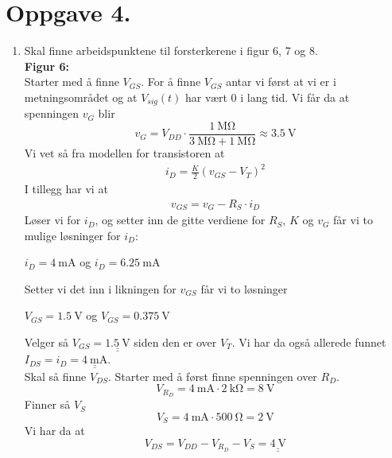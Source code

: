 \documentclass[a4paper,11pt,norsk]{article}
\begin{document}
\section*{Oppgave 4.}
\begin{enumerate}
    \item Skal finne arbeidspunktene til forsterkerene i figur 6, 7 og 8. \\
        
        \textbf{Figur 6:} \\
        Starter med å finne $V_{GS}$. For å finne $V_{GS}$ antar vi først at vi er i metningsområdet og at $V_{sig}(t)$ har vært 0 i lang tid.
        Vi får da at spenningen $v_{G}$ blir 
        \[
            v_{G} = V_{DD} \cdot \frac{\SI{1}{\mega\ohm}}{\SI{3}{\mega\ohm} + \SI{1}{\mega\ohm}} \approx \SI{3.5}{\volt}
        \]
        Vi vet så fra modellen for transistoren at 
        \begin{align}
            i_{D} = \frac{K}{2}\left(v_{GS} - V_T\right)^2
        \end{align}
        I tillegg har vi at 
        \begin{align}
            v_{GS} = v_{G} - R_S \cdot i_D
        \end{align}
        \newpage
        Løser vi for $i_{D}$, og setter inn de gitte verdiene for $R_S$, $K$ og $v_{G}$ 
        får vi to mulige løsninger for $i_{D}$:
        \begin{center}
            $i_D = \SI{4}{\milli\ampere}$ og $i_D = \SI{6.25}{\milli\ampere}$ 
        \end{center}
        Setter vi det inn i likningen for $v_{GS}$ får vi to løsninger
        \begin{center}
            $V_{GS} = \SI{1.5}{\volt}$ og $V_{GS} = \SI{0.375}{\volt}$ 
        \end{center}
        Velger så $V_{GS} = \underline{\underline{\SI{1.5}{\volt}}}$ siden den er over $V_T$.
        Vi har da også allerede funnet $I_{DS} = i_D = \underline{\underline{\SI{4}{\milli\ampere}}}$. \\

        Skal så finne $V_{DS}$. Starter med å først finne spenningen over $R_D$.
        \[
            V_{R_D} = \SI{4}{\milli\ampere} \cdot \SI{2}{\kilo\ohm} = \SI{8}{\volt}
        \]
        Finner så $V_S$
        \[
            V_S = \SI{4}{\milli\ampere} \cdot \SI{500}{\ohm} = \SI{2}{\volt}
        \]
        Vi har da at  
        \[
            V_{DS} = V_{DD} - V_{R_D} - V_S = \underline{\underline{\SI{4}{\volt}}}
        \]


\end{enumerate}
\end{document}
